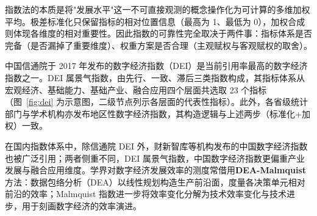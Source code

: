 指数法的本质是将"发展水平"这一不可直接观测的概念操作化为可计算的多维加权平均。极差标准化只保留指标的相对位置信息（最高为 1、最低为 0），加权合成则体现各维度的相对重要性。因此指数的可靠性完全取决于两件事：指标体系是否完备（是否漏掉了重要维度）、权重方案是否合理（主观赋权与客观赋权的取舍）。

中国信通院于 2017 年发布的数字经济指数（DEI）是当前引用率最高的数字经济指数之一。DEI 属景气指数，由先行、一致、滞后三类指数构成，其指标体系从宏观经济、基础能力、基础产业、融合应用四个层面共选取 23 个指标（图~\ref{fig:dei} 为示意图，二级节点列示各层面的代表性指标）。此外，各省级统计部门与学术机构亦发布地区性数字经济指数，其构造逻辑与上述两步（标准化+加权）一致。

在国内指数体系中，除信通院 DEI 外，财新智库等机构发布的中国数字经济指数也被广泛引用；两者侧重不同，DEI 属景气指数，中国数字经济指数更偏重产业发展与融合应用维度。学界对数字经济发展效率的测度常借用\textbf{DEA-Malmquist} 方法：数据包络分析（DEA）以线性规划构造生产前沿面，度量各决策单元相对前沿的效率；Malmquist 指数进一步将效率变化分解为技术效率变化与技术进步，用于刻画数字经济的效率演进。

